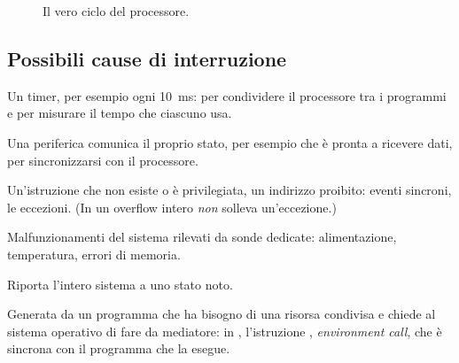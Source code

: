 \begin{figure}[htb]
\centering
{}
\caption{Il vero ciclo del processore.}
\label{fig:ins:real}
\end{figure}

\subsection{Possibili cause di interruzione}

\begin{description}[style=nextline,leftmargin=1.5em]
\item[Interruzione periodica.] Un timer, per esempio ogni 10~ms: per
  condividere il processore tra i programmi e per misurare il tempo che
  ciascuno usa.
\item[Interruzione di I/O.] Una periferica comunica il proprio stato, per
  esempio che è pronta a ricevere dati, per sincronizzarsi con il processore.
\item[Errori nel programma.] Un'istruzione che non esiste o è privilegiata, un
  indirizzo proibito: eventi sincroni, le eccezioni. (In \riscv un overflow
  intero \emph{non} solleva un'eccezione.)
\item[Guasti.] Malfunzionamenti del sistema rilevati da sonde dedicate:
  alimentazione, temperatura, errori di memoria.
\item[Reset.] Riporta l'intero sistema a uno stato noto.
\item[Interruzione software.] Generata da un programma che ha bisogno di una
  risorsa condivisa e chiede al sistema operativo di fare da mediatore: in
  \riscv, l'istruzione , \emph{environment call}, che è sincrona
  con il programma che la esegue.
\end{description}

